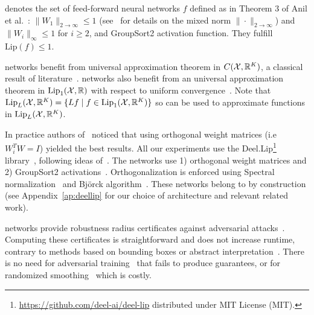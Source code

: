 \begin{definition}
\LipCl denotes the set of feed-forward neural networks $f$ defined as in Theorem 3 of Anil et al.~\cite{anil2019sorting}: $\|W_1\|_{2\rightarrow\infty}\leq 1$ (see~\cite{cape2019two} for details on the mixed norm $\|\cdot\|_{2\rightarrow\infty}$) and $\|W_i\|_{\infty}\leq 1$ for $i\geq 2$, and GroupSort2 activation function. They fulfill $\text{Lip}(f)\leq 1$.  
\end{definition}  
 \begin{remark}
 \LipInf networks benefit from universal approximation theorem in $C(\mathcal{X},\mathbb{R}^K)$, a classical result of literature~\cite{hassoun1995fundamentals}. \LipCl networks also benefit from an universal approximation theorem in $\text{Lip}_1(\mathcal{X},\mathbb{R})$ with respect to uniform convergence~\cite{anil2019sorting}. Note that $\text{Lip}_L(\mathcal{X},\mathbb{R}^K)=\{Lf\mid f\in\text{Lip}_1(\mathcal{X},\mathbb{R}^K)\}$ so \LipCl can be used to approximate functions in $\text{Lip}_L(\mathcal{X},\mathbb{R}^K)$.
 \end{remark}
  
In practice authors of~\cite{anil2019sorting} noticed that using orthogonal weight matrices (i.e $W_i^TW=I$) yielded the best results. All our experiments use the Deel.Lip\footnote{\url{https://github.com/deel-ai/deel-lip} distributed under MIT License (MIT).} library~\cite{serrurier2020achieving}, following ideas of~\cite{anil2019sorting}. The networks use 1) orthogonal weight matrices and 2) GroupSort2 activations~\cite{anil2019sorting}. Orthogonalization is enforced using Spectral normalization~\cite{miyato2018spectral} and Bj{\"o}rck algorithm~\cite{bjorck1971iterative}. %
These networks belong to \LipCl by construction (see Appendix~\ref{ap:deellip} for our choice of architecture and relevant related work).   
  
  \LipCl networks provide robustness radius certificates against adversarial attacks~\cite{NEURIPS2018_48584348}. Computing these certificates is straightforward and does not increase runtime, contrary to methods based on bounding boxes or abstract interpretation~\cite{latorre2019lipschitz,weng2018towards,weng2018evaluating,zhang2021towards}. There is no need for adversarial training~\cite{madry2018towards} that fails to produce guarantees, or for randomized smoothing~\cite{pmlr-v97-cohen19c} which is costly.  %
    
